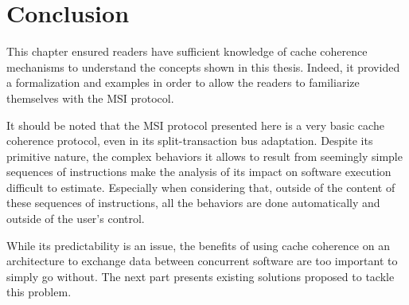 \section{Conclusion}
This chapter ensured readers have sufficient knowledge of cache coherence
mechanisms to understand the concepts shown in this thesis. Indeed, it provided
a formalization and examples in order to allow the readers to familiarize
themselves with the MSI protocol.

It should be noted that the MSI protocol presented here is a very basic cache
coherence protocol, even in its split-transaction bus adaptation. Despite its
primitive nature, the complex behaviors it allows to result from seemingly
simple sequences of instructions make the analysis of its impact on software
execution difficult to estimate. Especially when considering that, outside of
the content of these sequences of instructions, all the behaviors are done
automatically and outside of the user's control.

While its predictability is an issue, the benefits of using cache coherence on
an architecture to exchange data between concurrent software are too important
to simply go without. The next part presents existing solutions proposed to
tackle this problem.
